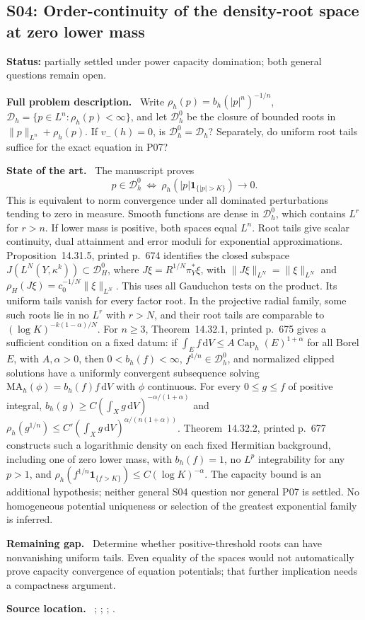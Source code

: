 \documentclass[11pt]{article}
\newcommand{\field}[1]{\par\medskip\noindent\textbf{#1.}\ }
\begin{document}
\subsection{S04: Order-continuity of the density-root space at zero lower mass}
\label{S04}
\noindent\textbf{Status:} partially settled under power capacity domination; both general questions remain open.
\field{Full problem description} Write $\rho_h(p)=b_h(|p|^n)^{-1/n}$, $\mathcal D_h=\{p\in L^n:\rho_h(p)<\infty\}$, and let $\mathcal D_h^0$ be the closure of bounded roots in $\|p\|_{L^n}+\rho_h(p)$. If $v_-(h)=0$, is $\mathcal D_h^0=\mathcal D_h$? Separately, do uniform root tails suffice for the exact equation in P07?
\field{State of the art} The manuscript proves
\[p\in\mathcal D_h^0\ \Longleftrightarrow\ \rho_h(|p|\mathbf1_{\{|p|>K\}})\to0.\]
This is equivalent to norm convergence under all dominated perturbations tending to zero in measure. Smooth functions are dense in $\mathcal D_h^0$, which contains $L^r$ for $r>n$. If lower mass is positive, both spaces equal $L^n$. Root tails give scalar continuity, dual attainment and error moduli for exponential approximations. Proposition~14.31.5, printed p.~674 identifies the closed subspace $J(L^N(Y,\kappa^k))\subset\mathcal D_H^0$, where $J\xi=R^{1/N}\pi_Y^*\xi$, with $\|J\xi\|_{L^N}=\|\xi\|_{L^N}$ and $\rho_H(J\xi)=c_0^{-1/N}\|\xi\|_{L^N}$. This uses all Gauduchon tests on the product. Its uniform tails vanish for every factor root. In the projective radial family, some such roots lie in no $L^r$ with $r>N$, and their root tails are comparable to $(\log K)^{-k(1-\alpha)/N}$. For $n\geq3$, Theorem~14.32.1, printed p.~675 gives a sufficient condition on a fixed datum: if $\int_Ef\,\mathrm dV\leq A\operatorname{Cap}_h(E)^{1+\alpha}$ for all Borel $E$, with $A,\alpha>0$, then $0<b_h(f)<\infty$, $f^{1/n}\in\mathcal D_h^0$, and normalized clipped solutions have a uniformly convergent subsequence solving $\mathrm{MA}_h(\phi)=b_h(f)f\,\mathrm dV$ with $\phi$ continuous. For every $0\leq g\leq f$ of positive integral, $b_h(g)\geq C(\int_Xg\,\mathrm dV)^{-\alpha/(1+\alpha)}$ and $\rho_h(g^{1/n})\leq C'(\int_Xg\,\mathrm dV)^{\alpha/(n(1+\alpha))}$. Theorem~14.32.2, printed p.~677 constructs such a logarithmic density on each fixed Hermitian background, including one of zero lower mass, with $b_h(f)=1$, no $L^p$ integrability for any $p>1$, and $\rho_h(f^{1/n}\mathbf1_{\{f>K\}})\leq C(\log K)^{-\alpha}$. The capacity bound is an additional hypothesis; neither general S04 question nor general P07 is settled. No homogeneous potential uniqueness or selection of the greatest exponential family is inferred.
\field{Remaining gap} Determine whether positive-threshold roots can have nonvanishing uniform tails. Even equality of the spaces would not automatically prove capacity convergence of equation potentials; that further implication needs a compactness argument.
\field{Source location} ; ; ; .
\end{document}
